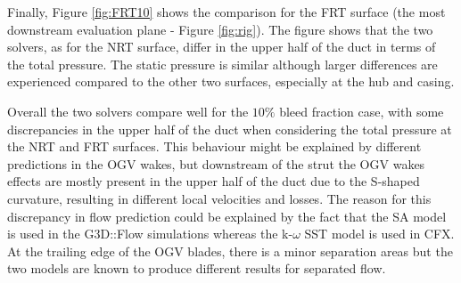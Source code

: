 Finally, Figure \ref{fig:FRT10} shows the comparison for the FRT surface (the most downstream evaluation plane - Figure \ref{fig:rig}). The figure shows that the two solvers, as for the NRT surface, differ in the upper half of the duct in terms of the total pressure. The static pressure is similar although larger differences are experienced compared to the other two surfaces, especially at the hub and casing.

Overall the two solvers compare well for the $10\%$ bleed fraction case, with some discrepancies in the upper half of the duct when considering the total pressure at the NRT and FRT surfaces. This behaviour might be explained by different predictions in the OGV wakes, but downstream of the strut the OGV wakes effects are mostly present in the upper half of the duct due to the S-shaped curvature, resulting in different local velocities and losses. The reason for this discrepancy in flow prediction could be explained by the fact that the SA model is used in the G3D::Flow simulations whereas the k-$\omega$ SST model is used in CFX. At the trailing edge of the OGV blades, there is a minor separation areas but the two models are known to produce different results for separated flow.
